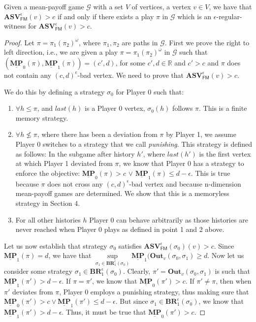 \begin{lemma}
\label{lemWitnessASVForFinStrat}
Given a mean-payoff game $\mathcal{G}$ with a set $V$ of vertices, a vertex $v \in V$, we have that $\mathbf{ASV}_{\mathsf{FM}}^{\epsilon}(v) > c$ if and only if there exists a play $\pi$ in $\mathcal{G}$ which is an $\epsilon$-regular-witness for $\mathbf{ASV}_{\mathsf{FM}}^{\epsilon}(v) > c$.
\end{lemma}
\begin{proof}
	Let $\pi = \pi_1 (\pi_2)^{\omega}$, where $\pi_1, \pi_2$ are paths in $\mathcal{G}$.
	First we prove the right to left direction, i.e., we are given a  play $\pi = \pi_1 (\pi_2)^{\omega}$ in $\mathcal{G}$ such that  $(\underline{\mathbf{MP}}_0(\pi), \underline{\mathbf{MP}}_1(\pi)) = (c', d)$, for some $c', d \in \mathbb{R}$ and $c' > c$ and $\pi$ does not contain any $(c,d)^{\epsilon}$-bad vertex. We need to prove that $\mathbf{ASV}_{\mathsf{FM}}^{\epsilon}(v) > c$.
	
	We do this by defining a strategy $\sigma_0$ for Player 0 such that:
	\begin{enumerate}
		\item $\forall h \leqslant \pi$, and $last(h)$ is a Player 0 vertex, $\sigma_0(h)$ follows $\pi$. This is a finite memory strategy.
		\item $\forall h \nleqslant \pi$, where there has been a deviation from $\pi$ by Player 1, we assume Player 0 switches to a strategy that we call \textit{punishing}. This strategy is defined as follows: In the subgame after history $h'$, where $last(h')$ is the first vertex at which Player 1 deviated from $\pi$, we know that Player 0 has a strategy to enforce the objective: $\underline{\mathbf{MP}}_0(\pi) > c$ $\lor$ $ \underline{\mathbf{MP}}_1(\pi) \leqslant d-\epsilon$. This is true because $\pi$ does not cross any $(c,d)^{\epsilon}$-bad vertex and because n-dimension mean-payoff games are determined. We show that this is a memoryless strategy in Section 4.
		\item For all other histories $h$ Player 0 can behave arbitrarily as those histories are never reached when Player 0 plays as defined in point 1 and 2 above.
	\end{enumerate}
	
	Let us now establish that strategy $\sigma_0$ satisfies $\mathbf{ASV}_{\mathsf{FM}}^{\epsilon}(\sigma_0)(v) > c$. Since $\underline{\mathbf{MP}}_1(\pi) = d$, we have that $\sup\limits_{\sigma_1 \in \mathbf{BR}^{\epsilon}_1(\sigma_0)} \underline{\mathbf{MP}}_1(\mathbf{Out}_v(\sigma_0, \sigma_1) \geqslant d$. Now let us consider some strategy $\sigma_1 \in \mathbf{BR}_1^{\epsilon}(\sigma_0)$. Clearly, $\pi' = \mathbf{Out}_v(\sigma_0, \sigma_1)$ is such that $\underline{\mathbf{MP}}_1(\pi') > d-\epsilon$. If $\pi = \pi'$, we know that $\underline{\mathbf{MP}}_0(\pi') > c$. If $\pi' \neq \pi$, then when $\pi'$ deviates from $\pi$, Player 0 employs a punishing strategy, thus making sure that $\underline{\mathbf{MP}}_0(\pi') > c \lor \underline{\mathbf{MP}}_1(\pi') \leqslant d - \epsilon$. But since $\sigma_1 \in \mathbf{BR}_1^{\epsilon}(\sigma_0)$, we know that $\underline{\mathbf{MP}}_1(\pi') > d - \epsilon$. Thus, it must be true that $\underline{\mathbf{MP}}_0(\pi') > c$.
	

\end{proof}
